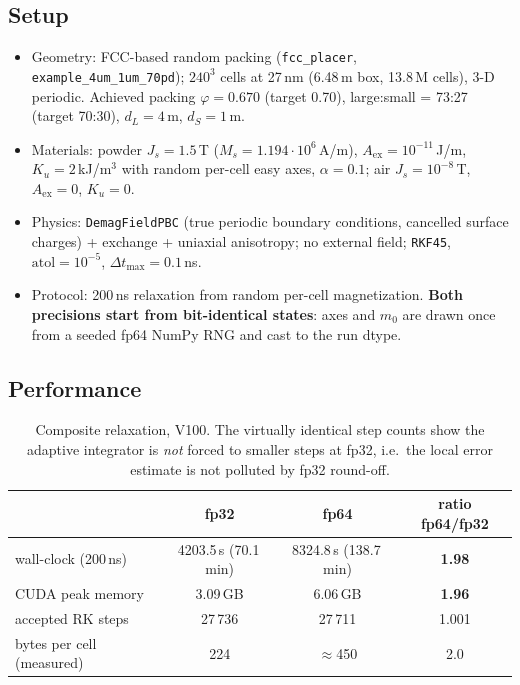 \documentclass[11pt,a4paper]{article}
\begin{document}
\subsection{Setup}
\begin{itemize}
\item Geometry: FCC-based random packing (\texttt{fcc\_placer},
      \texttt{example\_4um\_1um\_70pd}); $240^3$ cells at 27\,nm (6.48\,\textmu m
      box, 13.8\,M cells), 3-D periodic. Achieved packing $\varphi=0.670$
      (target 0.70), large:small = 73:27 (target 70:30), $d_L=4$\,\textmu m,
      $d_S=1$\,\textmu m.
\item Materials: powder $J_s=1.5$\,T ($M_s = 1.194\cdot10^{6}$\,A/m),
      $A_\mathrm{ex}=10^{-11}$\,J/m, $K_u = 2$\,kJ/m$^3$ with random per-cell
      easy axes, $\alpha=0.1$; air $J_s=10^{-8}$\,T, $A_\mathrm{ex}=0$, $K_u=0$.
\item Physics: \texttt{DemagFieldPBC} (true periodic boundary conditions,
      cancelled surface charges) + exchange + uniaxial anisotropy; no external
      field; \texttt{RKF45}, $\mathrm{atol}=10^{-5}$, $\Delta t_{\max}=0.1$\,ns.
\item Protocol: 200\,ns relaxation from random per-cell magnetization.
      \textbf{Both precisions start from bit-identical states}: axes and $m_0$
      are drawn once from a seeded fp64 NumPy RNG and cast to the run dtype.
\end{itemize}

\subsection{Performance}
\begin{table}[h]\centering\small
\begin{tabular}{lccc}
\toprule
 & fp32 & fp64 & ratio fp64/fp32 \\
\midrule
wall-clock (200\,ns) & 4203.5\,s (70.1\,min) & 8324.8\,s (138.7\,min) & \textbf{1.98} \\
CUDA peak memory & 3.09\,GB & 6.06\,GB & \textbf{1.96} \\
accepted RK steps & 27\,736 & 27\,711 & 1.001 \\
bytes per cell (measured) & 224 & $\approx$450 & 2.0 \\
\bottomrule
\end{tabular}
\caption{Composite relaxation, V100. The virtually identical step counts show the
adaptive integrator is \emph{not} forced to smaller steps at fp32, i.e.\ the local
error estimate is not polluted by fp32 round-off.}
\end{table}
\end{document}
